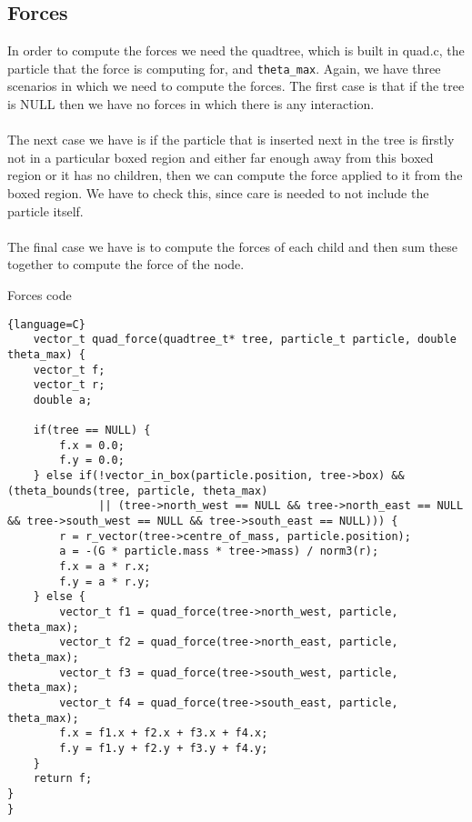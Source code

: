 \documentclass{article}
\begin{document}
\subsection{Forces}
In order to compute the forces we need the quadtree, which is built in quad.c, the particle that the force is computing for, and \verb|theta_max|. Again, we have three scenarios in which we need to compute the forces. The first case is that if the tree is NULL then we have no forces in which there is any interaction. 
\\\\
The next case we have is if the particle that is inserted next in the tree is firstly not in a particular boxed region and either far enough away from this boxed region or it has no children, then we can compute the force applied to it from the boxed region. We have to check this, since care is needed to not include the particle itself. 
\\\\
The final case we have is to compute the forces of each child and then sum these together to compute the force of the node. 
\begin{center}
    Forces code
\end{center}
\begin{lstlisting}{language=C}
    vector_t quad_force(quadtree_t* tree, particle_t particle, double theta_max) {
    vector_t f;
    vector_t r;
    double a;

    if(tree == NULL) {
        f.x = 0.0;
        f.y = 0.0;
    } else if(!vector_in_box(particle.position, tree->box) && (theta_bounds(tree, particle, theta_max) 
              || (tree->north_west == NULL && tree->north_east == NULL && tree->south_west == NULL && tree->south_east == NULL))) {
        r = r_vector(tree->centre_of_mass, particle.position);
        a = -(G * particle.mass * tree->mass) / norm3(r);
        f.x = a * r.x;
        f.y = a * r.y;
    } else {
        vector_t f1 = quad_force(tree->north_west, particle, theta_max);
        vector_t f2 = quad_force(tree->north_east, particle, theta_max);
        vector_t f3 = quad_force(tree->south_west, particle, theta_max);
        vector_t f4 = quad_force(tree->south_east, particle, theta_max);
        f.x = f1.x + f2.x + f3.x + f4.x;
        f.y = f1.y + f2.y + f3.y + f4.y;
    }
    return f;
}
}
\end{lstlisting}
\end{document}
